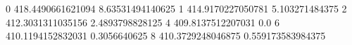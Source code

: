 0 418.4490661621094 8.63531494140625
1 414.9170227050781 5.103271484375
2 412.3031311035156 2.4893798828125
4 409.8137512207031 0.0
6 410.1194152832031 0.3056640625
8 410.3729248046875 0.559173583984375
